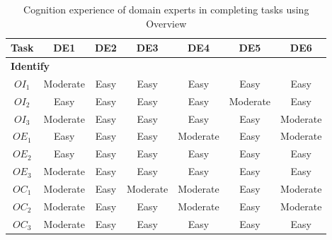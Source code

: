 \begin{table}[hbt!]
\caption{Cognition experience of domain experts in completing tasks using Overview}
\centering
\begin{tabular}{ ccccccc }
\hline
\textbf{Task} 	& \textbf{DE1} 	& \textbf{DE2} 	& \textbf{DE3} 	& \textbf{DE4} 	& \textbf{DE5} 	& \textbf{DE6} 	\\ \hline
\multicolumn{7}{l}{\textbf{Identify}}	\\ \hline
$OI_1$			& Moderate 		& Easy 			& Easy 			& Easy 			& Easy 			& Easy 			\\ 
$OI_2$			& Easy 			& Easy 			& Easy 			& Easy 			& Moderate 		& Easy 			\\ 
$OI_3$			& Moderate 		& Easy 			& Easy 			& Easy 			& Easy 			& Moderate 		\\ 
$OE_1$	& Easy & Easy & Easy & Moderate & Easy & Moderate 	\\ 
$OE_2$	& Easy & Easy & Easy & Easy & Easy & Easy 	\\ 
$OE_3$	& Moderate & Easy & Easy & Easy & Easy & Easy \\
$OC_1$			& Moderate 		& Easy 			& Moderate 		& Moderate 		& Easy 			& Moderate 		\\ 
$OC_2$			& Moderate 		& Easy 			& Easy 			& Moderate 		& Easy 			& Moderate 		\\ 
$OC_3$			& Moderate 		& Easy 			& Easy 			& Easy 			& Easy 			& Easy 			\\
\hline
\end{tabular}
\end{table}

